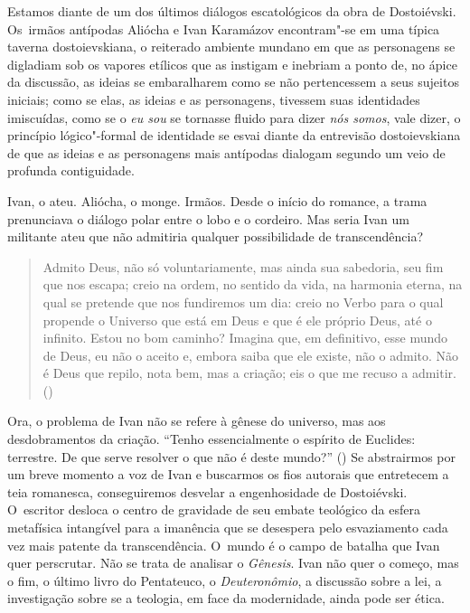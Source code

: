 Estamos diante de um dos últimos diálogos escatológicos da obra de
Dostoiévski. Os~irmãos antípodas Aliócha e Ivan Karamázov encontram"-se
em uma típica taverna dostoievskiana, o reiterado ambiente mundano em
que as personagens se digladiam sob os vapores etílicos que as instigam
e inebriam a ponto de, no ápice da discussão, as ideias se embaralharem
como se não pertencessem a seus sujeitos iniciais; como se elas, as
ideias e as personagens, tivessem suas identidades imiscuídas, como se o
\emph{eu sou} se tornasse fluido para dizer \emph{nós somos}, vale
dizer, o princípio lógico"-formal de identidade se esvai diante da
entrevisão dostoievskiana de que as ideias e as personagens mais
antípodas dialogam segundo um veio de profunda contiguidade.

Ivan, o ateu. Aliócha, o monge. Irmãos. Desde o início do romance, a
trama prenunciava o diálogo polar entre o lobo e o cordeiro. Mas seria
Ivan um militante ateu que não admitiria qualquer possibilidade de
transcendência?

\begin{quote}
Admito Deus, não só voluntariamente, mas ainda sua sabedoria, seu fim
que nos escapa; creio na ordem, no sentido da vida, na harmonia eterna,
na qual se pretende que nos fundiremos um dia: creio no Verbo para o
qual propende o Universo que está em Deus e que é ele próprio Deus, até
o infinito. Estou no bom caminho? Imagina que, em definitivo, esse mundo
de Deus, eu não o aceito e, embora saiba que ele existe, não o admito.
Não é Deus que repilo, nota bem, mas a criação; eis o que me recuso a
admitir. ()
\end{quote}

Ora, o problema de Ivan não se refere à gênese do universo, mas aos
desdobramentos da criação. ``Tenho essencialmente o espírito de
Euclides: terrestre. De que serve resolver o que não é deste mundo?''
() Se abstrairmos por um breve momento a voz de Ivan e buscarmos
os fios autorais que entretecem a teia romanesca, conseguiremos desvelar
a engenhosidade de Dostoiévski. O~escritor desloca o centro de gravidade
de seu embate teológico da esfera metafísica intangível para a imanência
que se desespera pelo esvaziamento cada vez mais patente da
transcendência. O~mundo é o campo de batalha que Ivan quer perscrutar.
Não se trata de analisar o \emph{Gênesis}. Ivan não quer o começo, mas o
fim, o último livro do Pentateuco, o \emph{Deuteronômio}, a discussão
sobre a lei, a investigação sobre se a teologia, em face da modernidade,
ainda pode ser ética.

